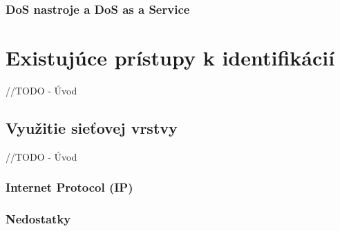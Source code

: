 \documentclass[
  printed, %
  table,   %
  lof,     %
  lot,     %
]{fithesis3}
\begin{document}
\subsection{DoS nastroje a DoS as a Service}




\chapter{Existujúce prístupy k identifikácií}
\label{ch:existing}
//TODO - Úvod
\section{Využitie sieťovej vrstvy}
//TODO - Úvod
\subsection{Internet Protocol (IP)}
\subsection{Nedostatky}
\end{document}
